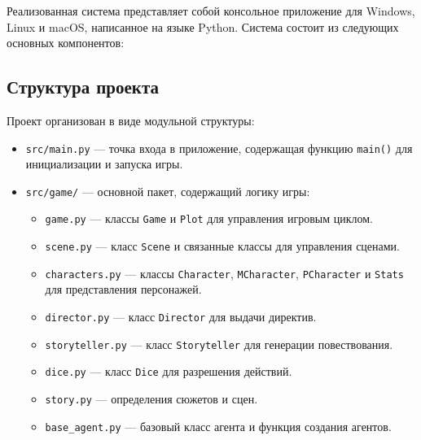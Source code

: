 Реализованная система представляет собой консольное приложение для Windows, Linux и macOS, написанное на языке Python. Система состоит из следующих основных компонентов:

\subsection{Структура проекта}

Проект организован в виде модульной структуры:

\begin{itemize}
	\item \texttt{src/main.py} --- точка входа в приложение, содержащая функцию \texttt{main()} для инициализации и запуска игры.
	
	\item \texttt{src/game/} --- основной пакет, содержащий логику игры:
	\begin{itemize}
		\item \texttt{game.py} --- классы \texttt{Game} и \texttt{Plot} для управления игровым циклом.
		\item \texttt{scene.py} --- класс \texttt{Scene} и связанные классы для управления сценами.
		\item \texttt{characters.py} --- классы \texttt{Character}, \texttt{MCharacter}, \texttt{PCharacter} и \texttt{Stats} для представления персонажей.
		\item \texttt{director.py} --- класс \texttt{Director} для выдачи директив.
		\item \texttt{storyteller.py} --- класс \texttt{Storyteller} для генерации повествования.
		\item \texttt{dice.py} --- класс \texttt{Dice} для разрешения действий.
		\item \texttt{story.py} --- определения сюжетов и сцен.
		\item \texttt{base\_agent.py} --- базовый класс агента и функция создания агентов.
	\end{itemize}
	

\end{itemize}
